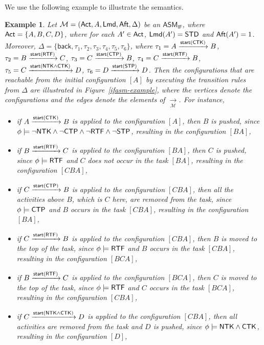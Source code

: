 \documentclass[preprint,12pt]{elsarticle}
\newtheorem{example}{Example}
\newcommand\Mm{{\mathcal{M} }}
\newcommand\act{{\sf Act}}
\newcommand\aft{{\sf Aft}}
\newcommand\lmd{{\sf Lmd}}
\newcommand\ntkflag{{\sf NTK}}
\newcommand\ctpflag{{\sf CTP}}
\newcommand\stpflag{{\sf STP}}
\newcommand\ctkflag{{\sf CTK}}
\newcommand\rtfflag{{\sf RTF}}
\newcommand{\IFAMASS}{\textsf{ASM}_\textsf{IF}}
\newcommand\back{{\mathsf{back} }}
\newcommand\startactivity{{\mathsf{start} }}
\newcommand{\STD}{\mathsf{STD}}
\begin{document}
We use the following example to illustrate the semantics.
\begin{example}
	Let $\Mm = (\act,A,\lmd,\aft,\Delta)$ be an $\IFAMASS$, where $\act = \{A,B,C,D\}$, where for each $A'\in\act$, $\lmd(A') = \STD$ and $\aft(A') = 1$. 
	Moreover, $\Delta = \{\back,\tau_1, \tau_2, \tau_3, \tau_4, \tau_5, \tau_6\}$, where 
	$\tau_1 = A \xrightarrow{\startactivity(\ctkflag)} B$,
	$\tau_2 = B \xrightarrow{\startactivity(\rtfflag)} C$,
	$\tau_3 = C \xrightarrow{\startactivity(\ctpflag)} B$,
	$\tau_4 = C \xrightarrow{\startactivity(\rtfflag)} B$,
	$\tau_5 = C \xrightarrow{\startactivity(\ntkflag\wedge\ctkflag)} D$,
	$\tau_6 = D \xrightarrow{\startactivity(\stpflag)} D$.
	Then the configurations that are reachable from the initial configuration $[A]$ by executing the transition rules from $\Delta$ are illustrated in Figure~\ref{ifasm-example}, where the vertices denote the configurations and the edges denote the elements of $\xrightarrow[\Mm]{}$. 
	For instance, 
	\begin{itemize}
		\item if $A \xrightarrow{\startactivity(\ctkflag)} B$ is applied to the configuration $[A]$, then $B$ is pushed, since $\phi\models\neg\ntkflag \wedge \neg \ctpflag \wedge \neg \rtfflag \wedge \neg \stpflag$, resulting in the configuration $[BA]$,
		\item if $B \xrightarrow{\startactivity(\rtfflag)} C$ is applied to the configuration $[BA]$, then $C$ is pushed, since $\phi\models\rtfflag$ and $C$ does not occur in the task $[BA]$, resulting in the configuration $[CBA]$,
		\item if $C \xrightarrow{\startactivity(\ctpflag)} B$ is applied to the configuration $[CBA]$, then all the activities above $B$, which is $C$ here, are removed from the task, since $\phi\models\ctpflag$ and $B$ occurs in the task $[CBA]$, resulting in the configuration $[BA]$,
		\item if $C \xrightarrow{\startactivity(\rtfflag)} B$ is applied to the configuration $[CBA]$, then $B$ is moved to the top of the task, since $\phi\models\rtfflag$ and $B$ occurs in the task $[CBA]$, resulting in the configuration $[BCA]$,
		\item if $B \xrightarrow{\startactivity(\rtfflag)} C$ is applied to the configuration $[BCA]$, then $C$ is moved to the top of the task, since $\phi\models\rtfflag$ and $C$ occurs in the task $[BCA]$, resulting in the configuration $[CBA]$,
		\item if $C \xrightarrow{\startactivity(\ntkflag\wedge\ctkflag)} D$ is applied to the configuration $[CBA]$, then all activities are removed from the task and $D$ is pushed, since $\phi\models\ntkflag\wedge\ctkflag$, resulting in the configuration $[D]$,

\end{itemize}
\end{example}
\end{document}
